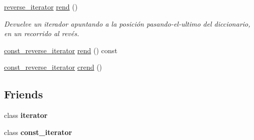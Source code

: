 \begin{Indent}
\begin{DoxyCompactItemize}
\item 
\hyperlink{classaed2_1_1map_a8e6a592062260177fd73b2f9897b1dd5}{reverse\+\_\+iterator} \hyperlink{classaed2_1_1map_a277f03b4f4b6b98879e4e4921081801f}{rend} ()
\begin{DoxyCompactList}\small\item\em Devuelve un iterador apuntando a la posición pasando-\/el-\/ultimo del diccionario, en un recorrido al revés. \end{DoxyCompactList}\item 
\hyperlink{classaed2_1_1map_aed66a216549d13078a3ea6978ea0b768}{const\+\_\+reverse\+\_\+iterator} \hyperlink{classaed2_1_1map_a7cf14a4b505505d0f074034b7399fb24}{rend} () const
\item 
\hyperlink{classaed2_1_1map_aed66a216549d13078a3ea6978ea0b768}{const\+\_\+reverse\+\_\+iterator} \hyperlink{classaed2_1_1map_a40933b2efe1cb479de9195ea947244d1}{crend} ()
\end{DoxyCompactItemize}
\end{Indent}
\subsection*{Friends}
\begin{DoxyCompactItemize}
\item 
\mbox{\label{classaed2_1_1map_a67171474c4da6cc8efe0c7fafefd2b2d}} 
class {\bfseries iterator}
\item 
\mbox{\label{classaed2_1_1map_ac220ce1c155db1ac44146c12d178056f}} 
class {\bfseries const\+\_\+iterator}
\end{DoxyCompactItemize}
